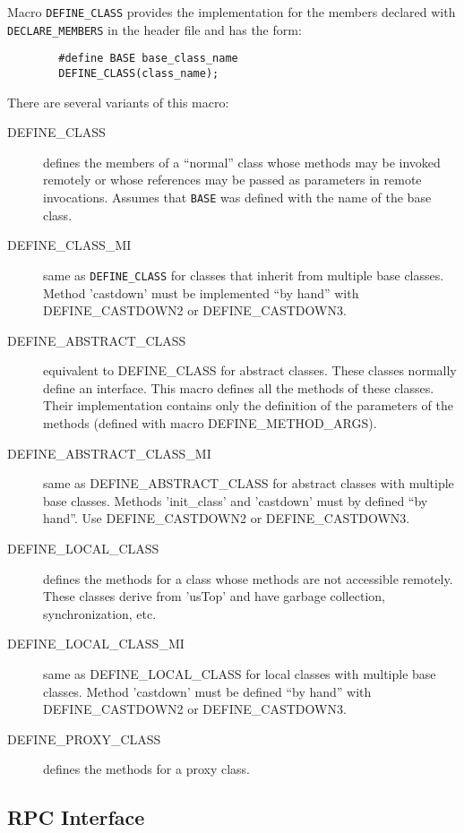 Macro {\tt DEFINE\_CLASS} provides the implementation for the members
declared with {\tt DECLARE\_MEMBERS} in the header file and has the
form:

\begin{verbatim}
        #define BASE base_class_name
        DEFINE_CLASS(class_name);
\end{verbatim}

There are several variants of this macro:
\begin{description}
\item[DEFINE\_CLASS] defines the members of a ``normal'' class
whose methods may be invoked remotely or whose references may be
passed as parameters in remote invocations. Assumes that {\tt BASE}
was defined with the name of the base class.

\item[DEFINE\_CLASS\_MI] same as {\tt DEFINE\_CLASS} for classes that
inherit from multiple base classes. Method 'castdown' must be
implemented ``by hand'' with DEFINE\_CASTDOWN2 or DEFINE\_CASTDOWN3.

\item[DEFINE\_ABSTRACT\_CLASS] equivalent to DEFINE\_CLASS for abstract
classes. These classes normally define an interface. This macro
defines all the methods of these classes. Their implementation
contains only the definition of the parameters of the methods (defined
with macro DEFINE\_METHOD\_ARGS).

\item[DEFINE\_ABSTRACT\_CLASS\_MI] same as DEFINE\_ABSTRACT\_CLASS for
abstract classes with multiple base classes. Methods 'init\_class' and
'castdown' must by defined ``by hand''. Use DEFINE\_CASTDOWN2 or
DEFINE\_CASTDOWN3.

\item[DEFINE\_LOCAL\_CLASS] defines the methods for a class whose
methods are not accessible remotely. These classes derive from 'usTop'
and have garbage collection, synchronization, etc. 

\item[DEFINE\_LOCAL\_CLASS\_MI] same as DEFINE\_LOCAL\_CLASS for local
classes with multiple base classes. Method 'castdown' must be defined
``by hand'' with DEFINE\_CASTDOWN2 or DEFINE\_CASTDOWN3.

\item[DEFINE\_PROXY\_CLASS] defines the methods for a proxy class.
\end{description}

\subsection{RPC Interface}

